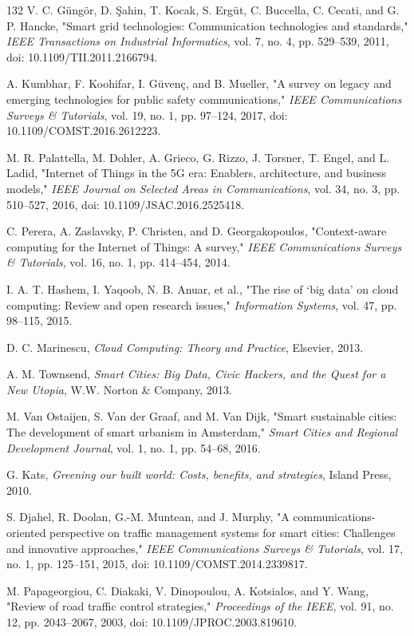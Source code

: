 \documentclass[pdflatex,sn-mathphys-num]{sn-jnl}%
\theoremstyle{thmstyleone}%
\theoremstyle{thmstyletwo}%
\theoremstyle{thmstylethree}%
\begin{document}
\begin{thebibliography}{132}
 V. C. G\"ung\"or, D. \c{S}ahin, T. Kocak, S. Erg\"ut, C. Buccella, C. Cecati, and G. P. Hancke, "Smart grid technologies: Communication technologies and standards," \emph{IEEE Transactions on Industrial Informatics}, vol. 7, no. 4, pp. 529--539, 2011, doi: 10.1109/TII.2011.2166794.

 A. Kumbhar, F. Koohifar, I. G\"uven\c{c}, and B. Mueller, "A survey on legacy and emerging technologies for public safety communications," \emph{IEEE Communications Surveys \& Tutorials}, vol. 19, no. 1, pp. 97--124, 2017, doi: 10.1109/COMST.2016.2612223.

 M. R. Palattella, M. Dohler, A. Grieco, G. Rizzo, J. Torsner, T. Engel, and L. Ladid, "Internet of Things in the 5G era: Enablers, architecture, and business models," \emph{IEEE Journal on Selected Areas in Communications}, vol. 34, no. 3, pp. 510--527, 2016, doi: 10.1109/JSAC.2016.2525418.

 C. Perera, A. Zaslavsky, P. Christen, and D. Georgakopoulos, "Context-aware computing for the Internet of Things: A survey," \emph{IEEE Communications Surveys \& Tutorials}, vol. 16, no. 1, pp. 414--454, 2014.

 I. A. T. Hashem, I. Yaqoob, N. B. Anuar, et al., "The rise of `big data' on cloud computing: Review and open research issues," \emph{Information Systems}, vol. 47, pp. 98--115, 2015.

 D. C. Marinescu, \emph{Cloud Computing: Theory and Practice}, Elsevier, 2013.

 A. M. Townsend, \emph{Smart Cities: Big Data, Civic Hackers, and the Quest for a New Utopia}, W.W. Norton \& Company, 2013.

 M. Van Ostaijen, S. Van der Graaf, and M. Van Dijk, "Smart sustainable cities: The development of smart urbanism in Amsterdam," \emph{Smart Cities and Regional Development Journal}, vol. 1, no. 1, pp. 54--68, 2016.

 G. Kats, \emph{Greening our built world: Costs, benefits, and strategies}, Island Press, 2010.

 S. Djahel, R. Doolan, G.-M. Muntean, and J. Murphy, "A communications-oriented perspective on traffic management systems for smart cities: Challenges and innovative approaches," \emph{IEEE Communications Surveys \& Tutorials}, vol. 17, no. 1, pp. 125--151, 2015, doi: 10.1109/COMST.2014.2339817.

 M. Papageorgiou, C. Diakaki, V. Dinopoulou, A. Kotsialos, and Y. Wang, "Review of road traffic control strategies," \emph{Proceedings of the IEEE}, vol. 91, no. 12, pp. 2043--2067, 2003, doi: 10.1109/JPROC.2003.819610.


\end{thebibliography}
\end{document}
